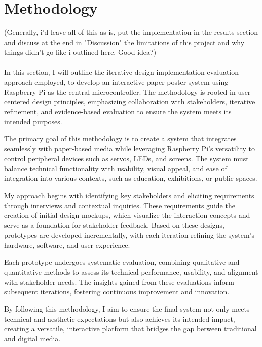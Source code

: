 \chapter{Methodology}
\label{sec:Methodology}

(Generally, i'd leave all of this as is, put the implementation in the results section and discuss at the end in "Discussion" the limitations of this project and why things didn't go like i outlined here. Good idea?)\\\\

In this section, I will outline the iterative design-implementation-evaluation approach employed, to develop an interactive paper poster system using Raspberry Pi as the central microcontroller. The methodology is rooted in user-centered design principles, emphasizing collaboration with stakeholders, iterative refinement, and evidence-based evaluation to ensure the system meets its intended purposes.

The primary goal of this methodology is to create a system that integrates seamlessly with paper-based media while leveraging Raspberry Pi's versatility to control peripheral devices such as servos, LEDs, and screens. The system must balance technical functionality with usability, visual appeal, and ease of integration into various contexts, such as education, exhibitions, or public spaces.

My approach begins with identifying key stakeholders and eliciting requirements through interviews and contextual inquiries. These requirements guide the creation of initial design mockups, which visualize the interaction concepts and serve as a foundation for stakeholder feedback. Based on these designs, prototypes are developed incrementally, with each iteration refining the system's hardware, software, and user experience.

Each prototype undergoes systematic evaluation, combining qualitative and quantitative methods to assess its technical performance, usability, and alignment with stakeholder needs. The insights gained from these evaluations inform subsequent iterations, fostering continuous improvement and innovation.

By following this methodology, I aim to ensure the final system not only meets technical and aesthetic expectations but also achieves its intended impact, creating a versatile, interactive platform that bridges the gap between traditional and digital media.

